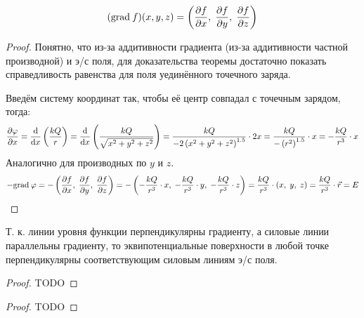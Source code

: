 \[ (\mathrm{grad}\: f)(x, y, z) = \left( \frac{\partial f}{\partial x},\;\frac{\partial f}{\partial y},\;\frac{\partial f}{\partial z} \right) \]

\begin{proof}
	Понятно, что из-за аддитивности градиента (из-за аддитивности частной производной) и э/с поля, для доказательства теоремы достаточно показать справедливость равенства для поля уединённого точечного заряда.\par
	Введём систему координат так, чтобы её центр совпадал с точечным зарядом, тогда:
	\[ \frac{\partial \varphi}{\partial x} = \frac{\text{d}}{\text{d} x} \left( \frac{kQ}{r} \right) = \frac{\text{d}}{\text{d} x} \left( \frac{kQ}{\sqrt{x^2+y^2+z^2}} \right) = \frac{kQ}{-2 \left( x^2 + y^2 + z^2 \right)^{1.5}} \cdot 2x = \frac{kQ}{-\left( r^2 \right)^{1.5}} \cdot x = -\frac{kQ}{r^3} \cdot x\]
	Аналогично для производных по $y$ и $z$.
	\[ -\mathrm{grad}\: \varphi = -\left( \frac{\partial f}{\partial x},\;\frac{\partial f}{\partial y},\;\frac{\partial f}{\partial z} \right) = -\left( -\frac{kQ}{r^3} \cdot x,\; -\frac{kQ}{r^3} \cdot y,\; -\frac{kQ}{r^3} \cdot z \right) = \frac{kQ}{r^3} \cdot (x,\; y,\; z) = \frac{kQ}{r^3} \cdot \vec{r} = E \]
\end{proof}

Т. к. линии уровня функции перпендикулярны градиенту, а силовые линии параллельны градиенту, то эквипотенциальные поверхности в любой точке перпендикулярны соответствующим силовым линиям э/с поля.

\begin{proof}
	TODO
\end{proof}

\begin{proof}
	TODO
\end{proof}

